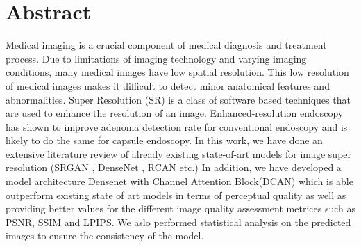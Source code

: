 
\chapter*{Abstract}
Medical imaging is a crucial component of medical diagnosis and treatment process. Due to limitations of imaging technology and varying imaging conditions, many medical images have low spatial resolution. This low resolution of medical images makes it difficult to detect minor anatomical features and abnormalities. Super Resolution (SR) is a class of software based techniques that are used to enhance the resolution of an image. Enhanced-resolution endoscopy has shown to improve adenoma detection rate for conventional endoscopy and is likely to do the same for capsule endoscopy.
\newline
In this work, we have done an extensive literature review of already existing state-of-art models for image super resolution (SRGAN \cite{SRGAN}, DenseNet \cite{DenseNET}, RCAN\cite{RCAN} etc.) In addition, we have developed a model architecture Densenet with Channel Attention Block(DCAN) which is able outperform existing state of art models in terms of perceptual quality as well as providing better values for the different image quality assessment metrices such as PSNR, SSIM and LPIPS. We aslo performed statistical analysis on the predicted images to ensure the consistency of the model.




